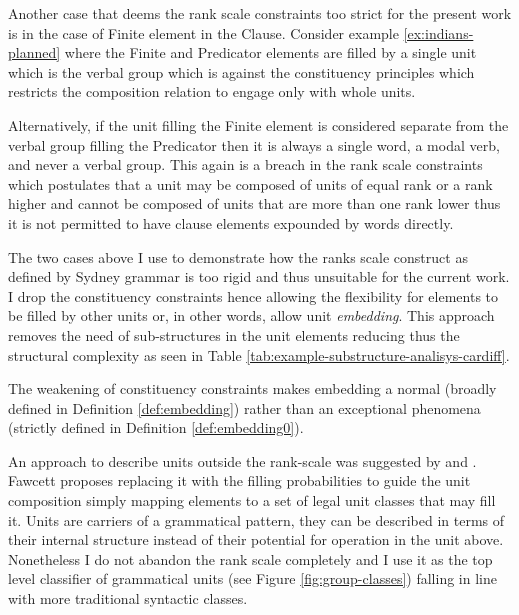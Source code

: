 Another case that deems the rank scale constraints too strict for the present work is in the case of Finite element in the Clause. Consider example \ref{ex:indians-planned} where the Finite and Predicator elements are filled by a single unit which is the verbal group which is against the constituency principles which restricts the composition relation to engage only with whole units. 

Alternatively, if the unit filling the Finite element is considered separate from the verbal group filling the Predicator then it is always a single word, a modal verb, and never a verbal group. This again is a breach in the rank scale constraints which postulates that a unit may be composed of units of equal rank or a rank higher and cannot be composed of units that are more than one rank lower thus it is not permitted to have clause elements expounded by words directly. 


The two cases above I use to demonstrate how the ranks scale construct as defined by Sydney grammar is too rigid and thus unsuitable for the current work. 
I drop the constituency constraints hence allowing the flexibility for elements to be filled by other units or, in other words, allow unit \textit{embedding}. This approach removes the need of sub-structures in the unit elements reducing thus the structural complexity as seen in Table \ref{tab:example-substructure-analisys-cardiff}.


The weakening of constituency constraints makes embedding a normal (broadly defined in Definition \ref{def:embedding}) rather than an exceptional phenomena (strictly defined in Definition \ref{def:embedding0}). 

An approach to describe units outside the rank-scale was suggested by \cite{Fawcett2000} and \cite{Butler1985}. Fawcett proposes replacing it with the filling probabilities to guide the unit composition simply mapping elements to a set of legal unit classes that may fill it. Units are carriers of a grammatical pattern, they can be described in terms of their internal structure instead of their potential for operation in the unit above. Nonetheless I do not abandon the rank scale completely and I use it as the top level classifier of grammatical units (see Figure \ref{fig:group-classes}) falling in line with more traditional syntactic classes.

